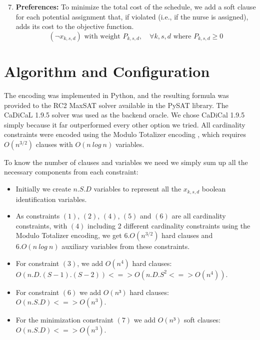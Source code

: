\documentclass[sigconf, 11pt]{acmart}
\begin{document}
\begin{enumerate}
    \setcounter{enumi}{6}
    \item \textbf{Preferences:} To minimize the total cost of the schedule, we add a soft clause for each potential assignment that, if violated (i.e., if the nurse is assigned), adds its cost to the objective function.
    \begin{equation}
        (\neg x_{k,s,d}) \text{ with weight } P_{k,s,d}, \quad \forall k,s,d \text{ where } P_{k,s,d} \geq 0
    \end{equation}
\end{enumerate}

\section{Algorithm and Configuration}
The encoding was implemented in Python, and the resulting formula was provided to the RC2 MaxSAT solver \cite{rc2} available in the PySAT library. The CaDiCaL 1.9.5 solver \cite{cadical} was used as the backend oracle. We chose CaDiCal 1.9.5 simply because it far outperformed every other option we tried. All cardinality constraints were encoded using the Modulo Totalizer encoding \cite{mtotalizer}, which requires $O(n^{3/2})$ clauses with $O(n \ log \ n)$ variables. 

To know the number of clauses and variables we need we simply sum up all the necessary components from each constraint:

\begin{itemize}
    \item Initially we create $n.S.D$ variables to represent all the $x_{k,s,d}$ boolean identification variables.
    \item As constraints $(1)$, $(2)$, $(4)$, $(5)$ and $(6)$ are all cardinality constraints, with $(4)$ including 2 different cardinality constraints using the Modulo Totalizer encoding, we get $6.O(n^{3/2})$ hard clauses and $6.O(n \ log \ n)$ auxiliary variables from these constraints.
    \item For constraint $(3)$, we add $O(n^4)$ hard clauses: $O(n.D.(S-1).(S-2)) <=> O(n.D.S^2 <=> O(n^4))$.
    \item For constraint $(6)$ we add $O(n³)$ hard clauses: $O(n.S.D) <=> O(n^3)$.
    \item For the minimization constraint $(7)$ we add $O(n³)$ soft clauses: $O(n.S.D) <=> O(n^3)$.
\end{itemize}
\end{document}

